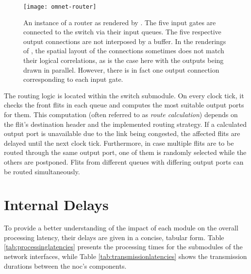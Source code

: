 \begin{figure}
    \centering
    \texttt{[image: omnet-router]}
    \caption[Simulator view of the router]{An instance of a router as rendered by \omnet{}. The five input gates are connected to the switch via their
    input queues. The five respective output connections are not interposed by a buffer. In the renderings of \omnet{}, the spatial layout of the
    connections sometimes does not match their logical correlations, as is the case here with the outputs being drawn in parallel. However, there is
    in fact one output connection corresponding to each input gate.}
    \label{fig:omnetrouter}
\end{figure}

The routing logic is located within the switch submodule. On every clock tick, it checks the front flits in each queue and computes the most suitable
output ports for them. This computation (often referred to as \textit{route calculation}) depends on the flit's destination header and the implemented routing
strategy. If a calculated output port is unavailable due to the link being congested, the affected flits are delayed until the next clock tick.
Furthermore, in case multiple flits are to be routed through the same output port, one of them is randomly selected while the others are postponed.
Flits from different queues with differing output ports can be routed simultaneously.

\section{Internal Delays}\label{sec:internaldelays}
To provide a better understanding of the impact of each module on the overall processing latency, their delays are given in a concise, tabular form.
Table \ref{tab:processinglatencies} presents the processing times for the submodules of the network interfaces, while Table
\vref{tab:transmissionlatencies} shows the transmission durations between the \gls{noc}'s components.

